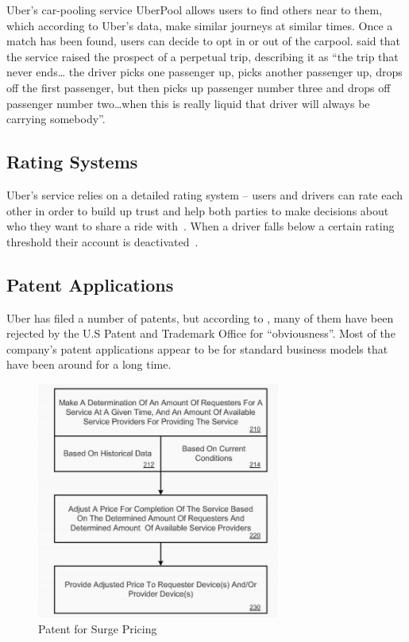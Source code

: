         Uber's car-pooling service UberPool allows users to find others near to them, which according to Uber's data, make similar journeys at similar times. Once a match has been found, users can decide to opt in or out of the carpool. \cite{iod2014} said that the service raised the prospect of a perpetual trip, describing it as ``the trip that never ends… the driver picks one passenger up, picks another passenger up, drops off the first passenger, but then picks up passenger number three and drops off passenger number two\ldots when this is really liquid that driver will always be carrying somebody''.

      \subsection{Rating Systems}\label{subsec:rating_systems}

        Uber's service relies on a detailed rating system -- users and drivers can rate each other in order to build up trust and help both parties to make decisions about who they want to share a ride with~\parencite{marr2015}. When a driver falls below a certain rating threshold their account is deactivated~\parencite{cook2015}.

      \subsection{Patent Applications}\label{subec:patent_applications}

        Uber has filed a number of patents, but according to \cite{decker2014}, many of them have been rejected by the U.S Patent and Trademark Office for ``obviousness''. Most of the company's patent applications appear to be for standard business models that have been around for a long time.

        \begin{figure}
          \centering
          \begin{minipage}{8cm}
            \centering
            \includegraphics[width=8cm]{inc/patent_for_surge_pricing.png}
            \caption[Patent for Surge Pricing]{Patent for Surge Pricing~\parencite{}}
            \label{fig:patent_for_surge_pricing}
          \end{minipage}
        \end{figure}

